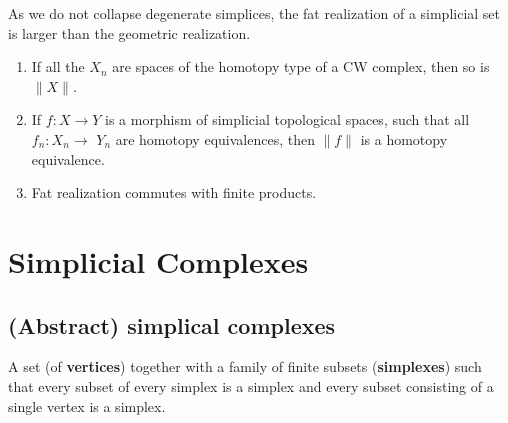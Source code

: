As we do not collapse degenerate simplices, the fat realization of a simplicial set is larger than the geometric realization.
\begin{prop}
    \begin{enumerate}
        \item If all the $X_n$ are spaces of the homotopy type of a CW complex, then so is $\|X\|$.
        \item If $f: X \rightarrow Y$ is a morphism of simplicial topological spaces, such that all $f_n: X_n \rightarrow$ $Y_n$ are homotopy equivalences, then $\|f\|$ is a homotopy equivalence.
        \item Fat realization commutes with finite products.
    \end{enumerate}
\end{prop}




\chapter{Simplicial Complexes}


\section{(Abstract) simplical complexes}

A set (of \textbf{vertices}) together with a  family of finite subsets (\textbf{simplexes}) such that every subset of every simplex is a simplex and every subset consisting of a single vertex is a simplex.  

